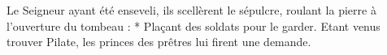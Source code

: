 Le Seigneur ayant été enseveli, ils scellèrent le sépulcre, roulant la pierre à l'ouverture du tombeau :
* Plaçant des soldats pour le garder.
\versseparator
Etant venus trouver Pilate, les princes des prêtres lui firent une demande.